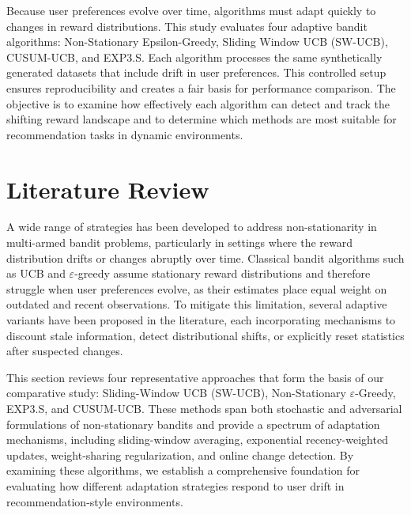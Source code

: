 \documentclass[pdflatex,sn-mathphys-num]{sn-jnl}
\theoremstyle{thmstyleone}%
\theoremstyle{thmstyletwo}%
\theoremstyle{thmstylethree}%
\begin{document}
Because user preferences evolve over time, algorithms must adapt quickly to changes in reward distributions. This study evaluates four adaptive bandit algorithms: Non-Stationary Epsilon-Greedy, Sliding Window UCB (SW-UCB), CUSUM-UCB, and EXP3.S. Each algorithm processes the same synthetically generated datasets that include drift in user preferences. This controlled setup ensures reproducibility and creates a fair basis for performance comparison. The objective is to examine how effectively each algorithm can detect and track the shifting reward landscape and to determine which methods are most suitable for recommendation tasks in dynamic environments.


\section{Literature Review}\label{sec2}

A wide range of strategies has been developed to address non-stationarity in
multi-armed bandit problems, particularly in settings where the reward distribution
drifts or changes abruptly over time. Classical bandit algorithms such as UCB and
$\varepsilon$-greedy assume stationary reward distributions and therefore struggle when
user preferences evolve, as their estimates place equal weight on outdated and recent
observations. To mitigate this limitation, several adaptive variants have been proposed
in the literature, each incorporating mechanisms to discount stale information, detect
distributional shifts, or explicitly reset statistics after suspected changes.

This section reviews four representative approaches that form the basis of our
comparative study: Sliding-Window UCB (SW-UCB), Non-Stationary
$\varepsilon$-Greedy, EXP3.S, and CUSUM-UCB. These methods span both stochastic
and adversarial formulations of non-stationary bandits and provide a spectrum of
adaptation mechanisms, including sliding-window averaging, exponential
recency-weighted updates, weight-sharing regularization, and online change detection.
By examining these algorithms, we establish a comprehensive foundation for evaluating 
how different adaptation strategies respond to user drift in recommendation-style 
environments.
\end{document}
